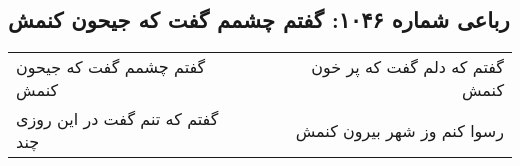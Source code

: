 \begin{center}
\section*{رباعی شماره ۱۰۴۶: گفتم چشمم گفت که جیحون کنمش}
\label{sec:1046}
\begin{longtable}{l p{0.5cm} r}
گفتم چشمم گفت که جیحون کنمش
&&
گفتم که دلم گفت که پر خون کنمش
\\
گفتم که تنم گفت در این روزی چند
&&
رسوا کنم وز شهر بیرون کنمش
\\
\end{longtable}
\end{center}
